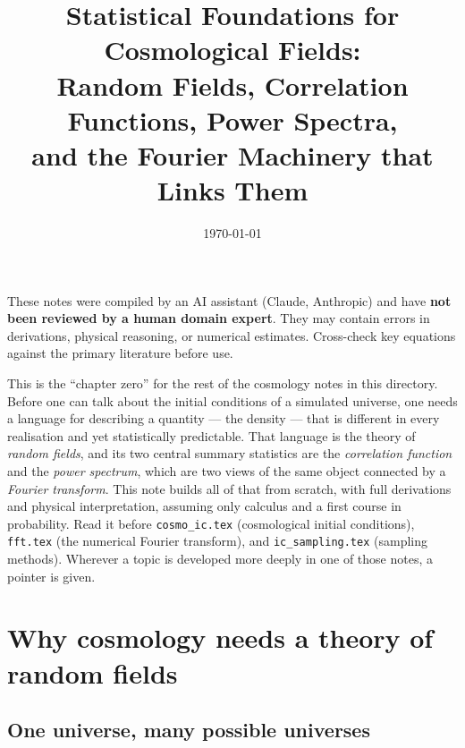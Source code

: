 \documentclass[12pt]{article}
\title{Statistical Foundations for Cosmological Fields:\\
       Random Fields, Correlation Functions, Power Spectra,\\
       and the Fourier Machinery that Links Them}
\author{}
\date{\today}
\newcommand{\code}[1]{\texttt{#1}}
\begin{document}
\maketitle

\begin{tcolorbox}[colback=yellow!10!white, colframe=orange!75!black,
                  title={\bfseries Disclaimer}]
These notes were compiled by an AI assistant (Claude, Anthropic) and have
\textbf{not been reviewed by a human domain expert}.  They may contain
errors in derivations, physical reasoning, or numerical estimates.
Cross-check key equations against the primary literature before use.
\end{tcolorbox}
\vspace{0.5em}

\begin{tcolorbox}[colback=blue!5!white, colframe=blue!60!black,
                  title={\bfseries What this note is for}]
This is the ``chapter zero'' for the rest of the cosmology notes in this
directory.  Before one can talk about the initial conditions of a
simulated universe, one needs a language for describing a quantity ---
the density --- that is different in every realisation and yet
statistically predictable.  That language is the theory of \emph{random
fields}, and its two central summary statistics are the
\emph{correlation function} and the \emph{power spectrum}, which are two
views of the same object connected by a \emph{Fourier transform}.  This
note builds all of that from scratch, with full derivations and physical
interpretation, assuming only calculus and a first course in
probability.  Read it before \code{cosmo\_ic.tex} (cosmological initial
conditions), \code{fft.tex} (the numerical Fourier transform), and
\code{ic\_sampling.tex} (sampling methods).  Wherever a topic is
developed more deeply in one of those notes, a pointer is given.
\end{tcolorbox}

\tableofcontents
\newpage

\section{Why cosmology needs a theory of random fields}
\label{sec:why}

\subsection{One universe, many possible universes}
\end{document}

